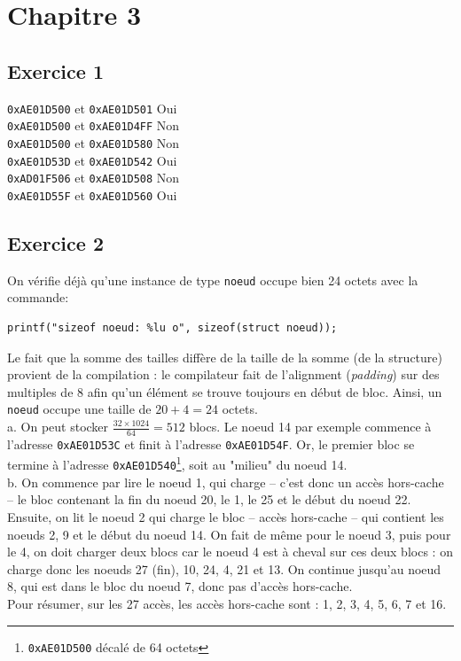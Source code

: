 \documentclass[11pt, a4 paper]{article}
\begin{document}
\pagebreak

\section{Chapitre 3}
\subsection{Exercice 1}
\noindent
\texttt{0xAE01D500} et \texttt{0xAE01D501} \hfill Oui \hfill \\
\texttt{0xAE01D500} et \texttt{0xAE01D4FF} \hfill Non \hfill \\
\texttt{0xAE01D500} et \texttt{0xAE01D580} \hfill Non \hfill \\
\texttt{0xAE01D53D} et \texttt{0xAE01D542} \hfill Oui \hfill \\
\texttt{0xAD01F506} et \texttt{0xAE01D508} \hfill Non \hfill \\
\texttt{0xAE01D55F} et \texttt{0xAE01D560} \hfill Oui \hfill \\

\subsection{Exercice 2}
On vérifie déjà qu'une instance de type \texttt{noeud} occupe bien 24 octets avec la commande:\\
\begin{lstlisting}[style=CStyle]
printf("sizeof noeud: %lu o", sizeof(struct noeud));
\end{lstlisting}
Le fait que la somme des tailles diffère de la taille de la somme (de la structure) provient de la compilation : le compilateur fait de l'alignment (\textit{padding}) sur des multiples de 8 afin qu'un élément se trouve toujours en début de bloc.
Ainsi, un \texttt{noeud} occupe une taille de $20+4=24$ octets.\\

a. On peut stocker $\frac{32\times1024}{64} = 512$ blocs.
Le noeud 14 par exemple commence à l'adresse \texttt{0xAE01D53C} et finit à l'adresse \texttt{0xAE01D54F}.
Or, le premier bloc se termine à l'adresse \texttt{0xAE01D540}\footnote{\texttt{0xAE01D500} décalé de 64 octets}, soit au "milieu" du noeud 14.\\

b. On commence par lire le noeud 1, qui charge -- c'est donc un accès hors-cache -- le bloc contenant la fin du noeud 20, le 1, le 25 et le début du noeud 22.
Ensuite, on lit le noeud 2 qui charge le bloc -- accès hors-cache -- qui contient les noeuds 2, 9 et le début du noeud 14.
On fait de même pour le noeud 3, puis pour le 4, on doit charger deux blocs car le noeud 4 est à cheval sur ces deux blocs : on charge donc les noeuds 27 (fin), 10, 24, 4, 21 et 13.
On continue jusqu'au noeud 8, qui est dans le bloc du noeud 7, donc pas d'accès hors-cache.\\
Pour résumer, sur les 27 accès, les accès hors-cache sont : 1, 2, 3, 4, 5, 6, 7 et 16.
\end{document}
